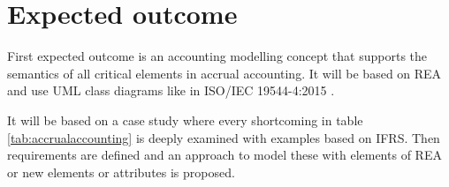 







\section{Expected outcome}\label{sec:outcome}
First expected outcome is an accounting modelling concept that supports the semantics of all critical elements in accrual accounting. It will be based on REA and use UML class diagrams like in ISO/IEC 19544-4:2015 \cite{ISOIEC1594442015}.

It will be based on a case study where every shortcoming in table \ref{tab:accrualaccounting} is deeply examined with examples based on IFRS. Then requirements are defined and an approach to model these with elements of REA or new elements or attributes is proposed.

